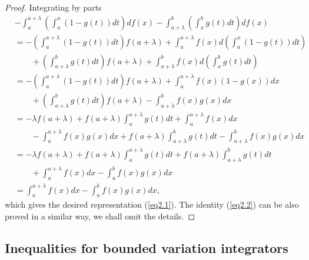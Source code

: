 \documentclass{amsart}
\theoremstyle{plain}
\numberwithin{equation}{section}
\begin{document}
\begin{proof}
Integrating by parts
\begin{align*}
&-  \int_a^{a + \lambda } {\left( {\int_a^x {\left( {1 - g\left( t
\right)} \right)dt} } \right)df\left( x \right)} - \int_{a +
\lambda }^b {\left( {\int_x^b {g\left( t \right)dt} }
\right)df\left( x \right)}
\\
&= - \left( {\int_a^{a + \lambda } {\left( {1 - g\left( t \right)}
\right)dt} } \right)f\left( {a + \lambda } \right) + \int_a^{a +
\lambda } {f\left( x \right)d\left( {\int_a^x {\left( {1 - g\left(
t \right)} \right)dt} } \right)}
\\
&\qquad + \left( {\int_{a + \lambda }^b {g\left( t \right)dt} }
\right)f\left( {a + \lambda } \right) + \int_{a + \lambda }^b
{f\left( x \right)d\left( {\int_x^b {g\left( t \right)dt} }
\right)}
\\
&=  - \left( {\int_a^{a + \lambda } {\left( {1 - g\left( t
\right)} \right)dt} } \right)f\left( {a + \lambda } \right) +
\int_a^{a + \lambda } {f\left( x \right)\left( {1 - g\left( x
\right)} \right)dx}
\\
&\qquad + \left( {\int_{a + \lambda }^b {g\left( t \right)dt} }
\right)f\left( {a + \lambda } \right) - \int_{a + \lambda }^b
{f\left( x \right)g\left( x \right)dx}
\\
&=  - \lambda f\left( {a + \lambda } \right) + f\left( {a +
\lambda } \right)\int_a^{a + \lambda } {g\left( t \right)dt}  +
\int_a^{a + \lambda } {f\left( x \right)dx}
\\
&\qquad - \int_a^{a + \lambda } {f\left( x \right)g\left( x
\right)dx} + f\left( {a + \lambda } \right)\int_{a + \lambda }^b
{g\left( t \right)dt}  - \int_{a + \lambda }^b {f\left( x
\right)g\left( x \right)dx}
\\
&=- \lambda f\left( {a + \lambda } \right) + f\left( {a + \lambda
} \right)\int_a^{a + \lambda } {g\left( t \right)dt}  + f\left( {a
+ \lambda } \right)\int_{a + \lambda }^b {g\left( t \right)dt}
\\
&\qquad + \int_a^{a + \lambda } {f\left( x \right)dx}  - \int_a^b
{f\left( x \right)g\left( x \right)dx}
\\
&=\int_a^{a + \lambda } {f\left( x \right)dx}  - \int_a^b {f\left(
x \right)g\left( x \right)dx},
\end{align*}
which gives the desired representation (\ref{eq2.1}). The identity
(\ref{eq2.2}) can be also proved in a similar way, we shall omit
the details.
\end{proof}

\subsection{Inequalities for bounded variation integrators}
\end{document}
